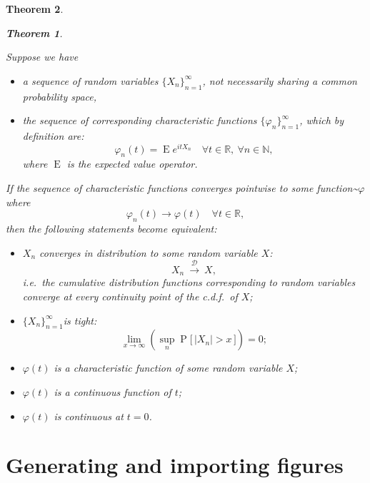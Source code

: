 \documentclass[
  12pt,
  a4paper,
  twoside]{book}
\providecommand{\tightlist}{%
  \setlength{\itemsep}{0pt}\setlength{\parskip}{0pt}}
\newtheorem{theorem}{Theorem}[section]
\DeclareMathOperator{\E}{E}
\DeclareMathOperator{\Prob}{P}
\begin{document}
\begin{theorem}
\begin{theorem}
\protect\hypertarget{thm:unlabeled-div-1}{}\label{thm:unlabeled-div-1}

\protect\hypertarget{thm:levy}{}{\label{thm:levy} }Suppose we have

\begin{itemize}
\tightlist
\item
  a sequence of random variables \(\{X_n\}_{n=1}^\infty\), not necessarily sharing a common probability space,
\item
  the sequence of corresponding characteristic functions \(\{\varphi_n\}_{n=1}^\infty\), which by definition are:
  \[
  \varphi_n(t) = \E e^{itX_n} \quad \forall t\in\mathbb{R},\ \forall n\in\mathbb{N},
  \]
  where \(\E\) is the expected value operator.
\end{itemize}

If the sequence of characteristic functions converges pointwise to some function\textasciitilde{}\(\varphi\) where
\[\varphi_n(t)\to\varphi(t) \quad \forall t\in\mathbb{R},\]
then the following statements become equivalent:

\begin{itemize}
\tightlist
\item
  \(X_n\) converges in distribution to some random variable \(X\):
  \[X_n\ \xrightarrow{\mathcal D}\ X,\]
  i.e.~the cumulative distribution functions corresponding to random variables converge at every continuity point of the c.d.f.~of \(X\);
\item
  \(\{X_n\}_{n=1}^\infty\)is tight:
  \[\lim_{x\to\infty}\left( \sup_n \Prob\big[\, |X_n|>x \,\big]\right) = 0;\]
\item
  \(\varphi(t)\) is a characteristic function of some random variable \(X\);
\item
  \(\varphi(t)\) is a continuous function of \(t\);
\item
  \(\varphi(t)\) is continuous at \(t=0\).
\end{itemize}

\end{theorem}
\end{theorem}

\hypertarget{generating-and-importing-figures}{%
\section{Generating and importing figures}\label{generating-and-importing-figures}}
\end{document}
